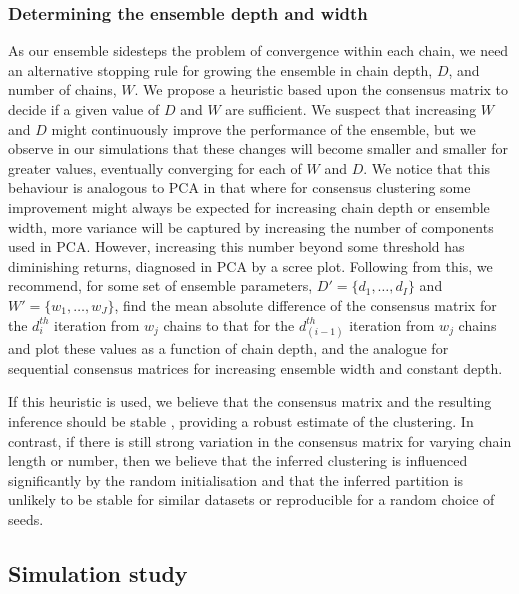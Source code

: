 \documentclass{bmcart}
\begin{document}
	\subsubsection*{Determining the ensemble depth and width} \label{sec:ensembleChoice}
	As our ensemble sidesteps the problem of convergence within each chain, we need an alternative stopping rule for growing the ensemble in chain depth, $D$, and number of chains, $W$. We propose a heuristic based upon the consensus matrix to decide if a given value of $D$ and $W$ are sufficient. We suspect that increasing $W$ and $D$ might continuously improve the performance of the ensemble, but we observe in our simulations that these changes will become smaller and smaller for greater values, eventually converging for each of $W$ and $D$. We notice that this behaviour is analogous to PCA in that where for consensus clustering some improvement might always be expected for increasing chain depth or ensemble width, more variance will be captured by increasing the number of components used in PCA. However, increasing this number beyond some threshold has diminishing returns, diagnosed in PCA by a scree plot. Following from this, we recommend, for some set of ensemble parameters, $D' = \{d_1, \ldots, d_I\}$ and $W'=\{w_1, \ldots, w_J\}$, find the mean absolute difference of the consensus matrix for the $d_i^{th}$ iteration from $w_j$ chains to that for the $d_{(i-1)}^{th}$ iteration from $w_j$ chains and plot these values as a function of chain depth, and the analogue for sequential consensus matrices for increasing ensemble width and constant depth.
	
	If this heuristic is used, we believe that the consensus matrix and the resulting inference should be stable \citep[see, e.g.,][]{von2005towards, meinshausen2010stability}, providing a robust estimate of the clustering. In contrast, if there is still strong variation in the consensus matrix for varying chain length or number, then we believe that the inferred clustering is influenced significantly by the random initialisation and that the inferred partition is unlikely to be stable for similar datasets or reproducible for a random choice of seeds.
	
	\subsection*{Simulation study}
	
\end{document}
